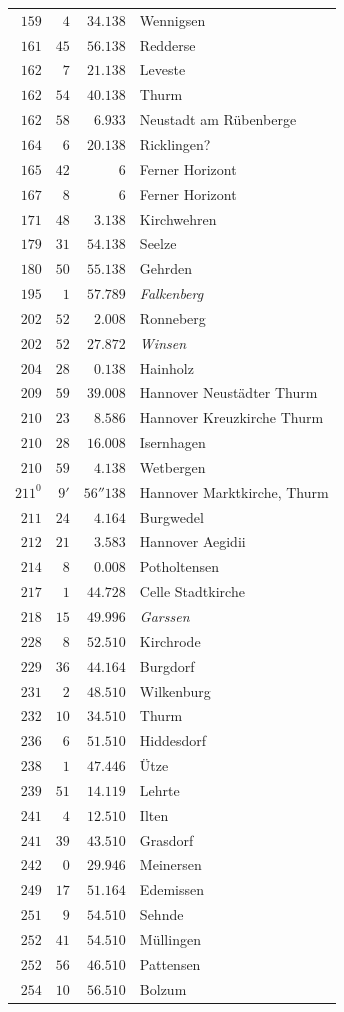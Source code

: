 \begin{longtable}{@{}rrrp{.61\linewidth}@{}}
\(159\)&\(4\)&\(34.138\)&\raggedright Wennigsen\tabularnewline
\(161\)&\(45\)&\(56.138\)&\raggedright Redderse\tabularnewline
\(162\)&\(7\)&\(21.138\)&\raggedright Leveste\tabularnewline
\(162\)&\(54\)&\(40.138\)&\raggedright Thurm\tabularnewline
\(162\)&\(58\)&\(6.933\)&\raggedright Neustadt am Rübenberge\tabularnewline
\(164\)&\(6\)&\(20.138\)&\raggedright Ricklingen?\tabularnewline
\(165\)&\(42\)&\(6\)&\raggedright Ferner Horizont\tabularnewline
\(167\)&\(8\)&\(6\)&\raggedright Ferner Horizont\tabularnewline
\(171\)&\(48\)&\(3.138\)&\raggedright Kirchwehren\tabularnewline
\(179\)&\(31\)&\(54.138\)&\raggedright Seelze\tabularnewline
\(180\)&\(50\)&\(55.138\)&\raggedright Gehrden\tabularnewline
\(195\)&\(1\)&\(57.789\)&\raggedright \textit{Falkenberg}\tabularnewline
\(202\)&\(52\)&\(2.008\)&\raggedright Ronneberg\tabularnewline
\(202\)&\(52\)&\(27.872\)&\raggedright \textit{Winsen}\tabularnewline
\(204\)&\(28\)&\(0.138\)&\raggedright Hainholz\tabularnewline
\(209\)&\(59\)&\(39.008\)&\raggedright Hannover Neustädter Thurm\tabularnewline
\(210\)&\(23\)&\(8.586\)&\raggedright Hannover Kreuzkirche Thurm\tabularnewline
\(210\)&\(28\)&\(16.008\)&\raggedright Isernhagen\tabularnewline
\(210\)&\(59\)&\(4.138\)&\raggedright Wetbergen\tabularnewline
\(211^{0}\)&\(9'\)&\(56''138\)&\raggedright Hannover Marktkirche, Thurm\tabularnewline
\(211\)&\(24\)&\(4.164\)&\raggedright Burgwedel\tabularnewline
\(212\)&\(21\)&\(3.583\)&\raggedright Hannover Aegidii\tabularnewline
\(214\)&\(8\)&\(0.008\)&\raggedright Potholtensen\tabularnewline
\(217\)&\(1\)&\(44.728\)&\raggedright Celle Stadtkirche\tabularnewline
\(218\)&\(15\)&\(49.996\)&\raggedright \textit{Garssen}\tabularnewline
\(228\)&\(8\)&\(52.510\)&\raggedright Kirchrode\tabularnewline
\(229\)&\(36\)&\(44.164\)&\raggedright Burgdorf\tabularnewline
\(231\)&\(2\)&\(48.510\)&\raggedright Wilkenburg\tabularnewline
\(232\)&\(10\)&\(34.510\)&\raggedright Thurm\tabularnewline
\(236\)&\(6\)&\(51.510\)&\raggedright Hiddesdorf\tabularnewline
\(238\)&\(1\)&\(47.446\)&\raggedright Ütze\tabularnewline
\(239\)&\(51\)&\(14.119\)&\raggedright Lehrte\tabularnewline
\(241\)&\(4\)&\(12.510\)&\raggedright Ilten\tabularnewline
\(241\)&\(39\)&\(43.510\)&\raggedright Grasdorf\tabularnewline
\(242\)&\(0\)&\(29.946\)&\raggedright Meinersen\tabularnewline
\(249\)&\(17\)&\(51.164\)&\raggedright Edemissen\tabularnewline
\(251\)&\(9\)&\(54.510\)&\raggedright Sehnde\tabularnewline
\(252\)&\(41\)&\(54.510\)&\raggedright Müllingen\tabularnewline
\(252\)&\(56\)&\(46.510\)&\raggedright Pattensen\tabularnewline
\(254\)&\(10\)&\(56.510\)&\raggedright Bolzum\tabularnewline

\end{longtable}
